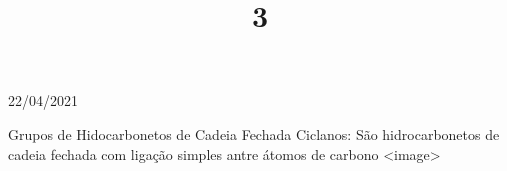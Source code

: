 \documentclass{SchoolBook}
\begin{document}
    \begin{day}{22/04/2021}
        \title{3}{Grupos de Hidocarbonetos de Cadeia Fechada}
        Ciclanos: São hidrocarbonetos de cadeia fechada com ligação simples antre átomos de carbono
        <image>
    \end{day}
\end{document}
